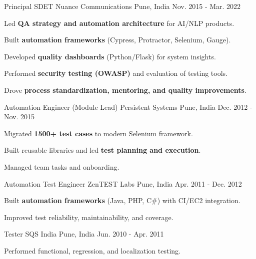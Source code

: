 \begin{cventries}
\cventry
  {Principal SDET}
  {Nuance Communications}
  {Pune, India}
  {Nov. 2015 - Mar. 2022}
  {
    \begin{cvitems}
      \item {Led \textbf{QA strategy and automation architecture} for AI/NLP products.}
      \item {Built \textbf{automation frameworks} (Cypress, Protractor, Selenium, Gauge).}
      \item {Developed \textbf{quality dashboards} (Python/Flask) for system insights.}
      \item {Performed \textbf{security testing (OWASP)} and evaluation of testing tools.}
      \item {Drove \textbf{process standardization, mentoring, and quality improvements}.}
    \end{cvitems}
  }

\cventry
  {Automation Engineer (Module Lead)}
  {Persistent Systems}
  {Pune, India}
  {Dec. 2012 - Nov. 2015}
  {
    \begin{cvitems}
      \item {Migrated \textbf{1500+ test cases} to modern Selenium framework.}
      \item {Built reusable libraries and led \textbf{test planning and execution}.}
      \item {Managed team tasks and onboarding.}
    \end{cvitems}
  }

\cventry
  {Automation Test Engineer}
  {ZenTEST Labs}
  {Pune, India}
  {Apr. 2011 - Dec. 2012}
  {
    \begin{cvitems}
      \item {Built \textbf{automation frameworks} (Java, PHP, C\#) with CI/EC2 integration.}
      \item {Improved test reliability, maintainability, and coverage.}
    \end{cvitems}
  }

\cventry
  {Tester}
  {SQS India}
  {Pune, India}
  {Jun. 2010 - Apr. 2011}
  {
    \begin{cvitems}
      \item {Performed functional, regression, and localization testing.}
    \end{cvitems}
  }
\end{cventries}
